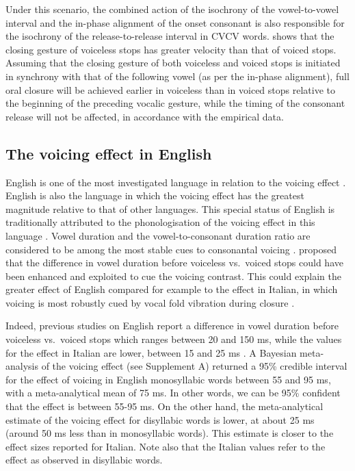 \documentclass[
  12pt,
  a4paper,
]{article}
\begin{document}
Under this scenario, the combined action of the isochrony of the
vowel-to-vowel interval and the in-phase alignment of the onset
consonant is also responsible for the isochrony of the
release-to-release interval in CVCV words. \citet{van-summers1987} shows
that the closing gesture of voiceless stops has greater velocity than
that of voiced stops. Assuming that the closing gesture of both
voiceless and voiced stops is initiated in synchrony with that of the
following vowel (as per the in-phase alignment), full oral closure will
be achieved earlier in voiceless than in voiced stops relative to the
beginning of the preceding vocalic gesture, while the timing of the
consonant release will not be affected, in accordance with the empirical
data.

\hypertarget{the-voicing-effect-in-english}{%
\subsection{The voicing effect in
English}\label{the-voicing-effect-in-english}}

English is one of the most investigated language in relation to the
voicing effect
\citep{meyer1904, heffner1937, house1953, belasco1953, peterson1960, halle1967, chen1970, klatt1973, lisker1974, laeufer1992, fowler1992, hussein1994, lampp2004, warren2005, durvasula2012, ko2018}.
English is also the language in which the voicing effect has the
greatest magnitude relative to that of other languages. This special
status of English is traditionally attributed to the phonologisation of
the voicing effect in this language \citep{sharf1964, de-jong2004}.
Vowel duration and the vowel-to-consonant duration ratio are considered
to be among the most stable cues to consonantal voicing
\citep{peterson1960, raphael1972, port1982}. \citet{kluender1988}
proposed that the difference in vowel duration before voiceless
vs.~voiced stops could have been enhanced and exploited to cue the
voicing contrast. This could explain the greater effect of English
compared for example to the effect in Italian, in which voicing is most
robustly cued by vocal fold vibration during closure \citep{pape2014}.

Indeed, previous studies on English report a difference in vowel
duration before voiceless vs.~voiced stops which ranges between 20 and
150 ms, while the values for the effect in Italian are lower, between 15
and 25 ms
\citep{caldognetto1979, farnetani1986, esposito2002, coretta2018j}. A
Bayesian meta-analysis of the voicing effect (see Supplement A) returned
a 95\% credible interval for the effect of voicing in English
monosyllabic words between 55 and 95 ms, with a meta-analytical mean of
75 ms. In other words, we can be 95\% confident that the effect is
between 55-95 ms. On the other hand, the meta-analytical estimate of the
voicing effect for disyllabic words is lower, at about 25 ms (around 50
ms less than in monosyllabic words). This estimate is closer to the
effect sizes reported for Italian. Note also that the Italian values
refer to the effect as observed in disyllabic words.
\end{document}
